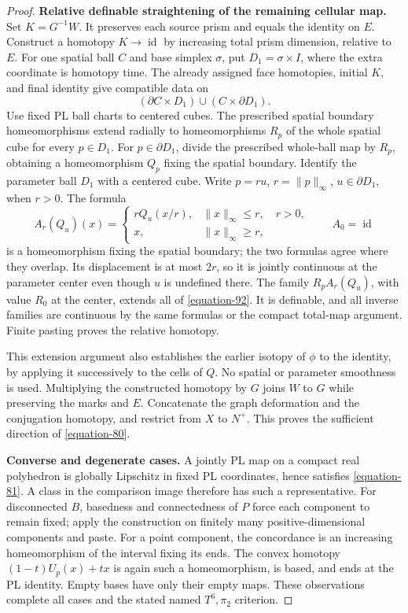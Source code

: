 \documentclass[11pt,a4paper]{article}
\theoremstyle{definition}
\begin{document}
\begin{proof}
\textbf{Relative definable straightening of the remaining cellular map.}\quad
Set \(K=G^{-1}W\). It preserves each source prism and equals the
identity on \(E\). Construct a homotopy \(K\to\operatorname{id}\)
by increasing total prism dimension, relative to \(E\).
For one spatial ball \(C\) and base simplex \(\sigma\), put
\(D_1=\sigma\times I\), where the extra coordinate is homotopy time.
The already assigned face homotopies, initial \(K\), and final identity
give compatible data on
\begin{equation}
 (\partial C\times D_1)\cup(C\times\partial D_1).
 \label{equation-92}
\end{equation}
Use fixed PL ball charts to centered cubes. The prescribed spatial
boundary homeomorphisms extend radially to homeomorphisms \(R_p\)
of the whole spatial cube for every \(p\in D_1\).
For \(p\in\partial D_1\), divide the prescribed whole-ball map by
\(R_p\), obtaining a homeomorphism \(Q_p\) fixing the spatial boundary.
Identify the parameter ball \(D_1\) with a centered cube. Write
\(p=ru\), \(r=\|p\|_\infty\), \(u\in\partial D_1\), when \(r>0\).
The formula
\begin{equation}
 A_r(Q_u)(x)=
 \begin{cases}
   rQ_u(x/r),&\|x\|_\infty\leq r,\quad r>0,\\
   x,&\|x\|_\infty\geq r,
 \end{cases}
 \qquad A_0=\operatorname{id}
 \label{equation-93}
\end{equation}
is a homeomorphism fixing the spatial boundary; the two formulas
agree where they overlap. Its displacement is at most \(2r\),
so it is jointly continuous at the parameter center even though
\(u\) is undefined there. The family \(R_pA_r(Q_u)\), with value
\(R_0\) at the center, extends all of \eqref{equation-92}. It is definable,
and all inverse families are continuous by the same formulas
or the compact total-map argument.
Finite pasting proves the relative homotopy.

This extension argument also establishes the earlier isotopy of
\(\phi\) to the identity, by applying it successively to the cells
of \(Q\). No spatial or parameter smoothness is used.
Multiplying the constructed homotopy by \(G\) joins \(W\) to \(G\)
while preserving the marks and \(E\). Concatenate the graph
deformation and the conjugation homotopy, and restrict from \(X\)
to \(N^+\). This proves the sufficient direction of \eqref{equation-80}.

\textbf{Converse and degenerate cases.}\quad
A jointly PL map on a compact real polyhedron is globally Lipschitz
in fixed PL coordinates, hence satisfies \eqref{equation-81}. A class in the
comparison image therefore has such a representative.
For disconnected \(B\), basedness and connectedness of \(P\) force
each component to remain fixed; apply the construction on finitely
many positive-dimensional components and paste.
For a point component, the concordance is an increasing homeomorphism
of the interval fixing its ends. The convex homotopy
\((1-t)U_p(x)+tx\) is again such a homeomorphism, is based, and ends
at the PL identity. Empty bases have only their empty maps.
These observations complete all cases and the stated named
\(T^6,\pi_2\) criterion.
\end{proof}
\end{document}
